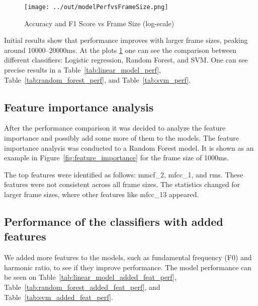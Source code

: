 \documentclass[conference]{IEEEtran}
\begin{document}
\begin{figure}[h]
    \centering
    \texttt{[image: ../out/modelPerfvsFrameSize.png]}
    \caption{Accuracy and F1 Score vs Frame Size (log-scale)}
    \label{fig:model_perf}
\end{figure}

Initial results show that performance improves with larger frame sizes, peaking around 10000–20000ms.
At the plots \ref{fig:model_perf} one can see the comparison between different classifiers: Logistic regression, Random Forest, and SVM.
One can see precise results in a Table~\ref{tab:linear_model_perf}, Table~\ref{tab:random_forest_perf}, and Table~\ref{tab:svm_perf}.

\subsection{Feature importance analysis}

After the performance comparison it was decided to analyze the feature importance and possibly add some more of them to the models.
The feature importance analysis was conducted to a Random Forest model. 
It is shown as an example in Figure~\ref{fig:feature_importance} for the frame size of 1000ms.

The top features were identified as follows: mmcf\_2, mfcc\_1, and rms. 
These features were not consistent across all frame sizes. 
The statistics changed for larger frame sizes, where other features like mfcc\_13 appeared.

\subsection{Performance of the classifiers with added features}

We added more features to the models, such as fundamental frequency (F0) and harmonic ratio, to see if they improve performance.
The model performance can be seen on Table~\ref{tab:linear_model_added_feat_perf}, Table~\ref{tab:random_forest_added_feat_perf}, and Table~\ref{tab:svm_added_feat_perf}.


\end{document}
